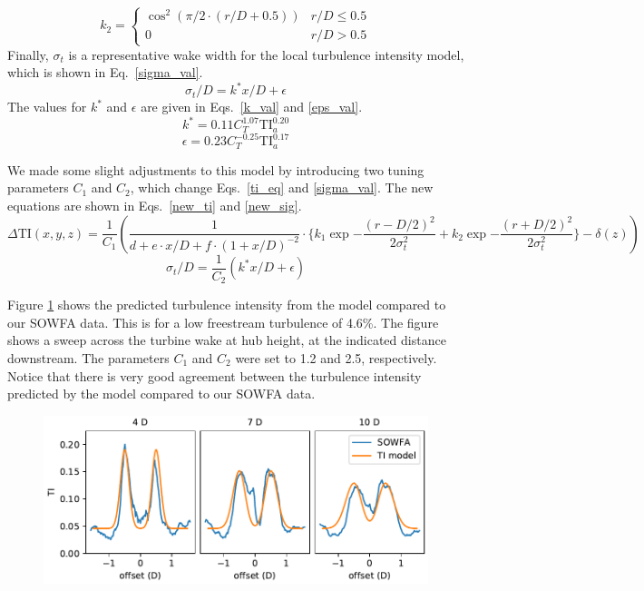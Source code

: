 \documentclass[11pt,letterpaper]{article}
\begin{document}
%
\begin{equation}
    \label{k2_val}
    k_2 = \begin{cases} 
      \cos^2{(\pi/2 \cdot (r/D + 0.5))} & r/D \leq 0.5 \\
      0 & r/D > 0.5
   \end{cases}
\end{equation}
% 
Finally, $\sigma_t$ is a representative wake width for the local turbulence intensity model, which is shown in Eq.~\ref{sigma_val}.
%
\begin{equation}
    \label{sigma_val}
    \sigma_t/D = k^* x/D + \epsilon
\end{equation}
% 
The values for $k^*$ and $\epsilon$ are given in Eqs.~\ref{k_val} and \ref{eps_val}.
%
\begin{equation}
    \label{k_val}
    k^* = 0.11 C_T^{1.07} \text{TI}_a ^ {0.20}
\end{equation}
%
\begin{equation}
    \label{eps_val}
    \epsilon = 0.23 C_T^{-0.25} \text{TI}_a^{0.17}
\end{equation}

We made some slight adjustments to this model by introducing two tuning parameters $C_1$ and $C_2$, which change Eqs.~\ref{ti_eq} and \ref{sigma_val}. The new equations are shown in Eqs.~\ref{new_ti} and \ref{new_sig}.
% 
\begin{equation}
    \label{new_ti}
    \Delta \text{TI}(x,y,z) = \frac{1}{C_1}(\frac{1}{d + e \cdot x/D + f\cdot(1+x/D)^{-2}} \cdot \Big\{k_1 \exp{-\frac{(r-D/2)^2}{2\sigma_t^2}} + k_2 \exp{-\frac{(r+D/2)^2}{2\sigma_t^2}} \Big\} - \delta(z))
\end{equation}
%
\begin{equation}
    \label{new_sig}
    \sigma_t/D = \frac{1}{C_2}(k^* x/D + \epsilon)
\end{equation}

Figure \ref{turbulence_sweep} shows the predicted turbulence intensity from the model compared to our SOWFA data. This is for a low freestream turbulence of 4.6\%. The figure shows a sweep across the turbine wake at hub height, at the indicated distance downstream. The parameters $C_1$ and $C_2$ were set to 1.2 and 2.5, respectively. Notice that there is very good agreement between the turbulence intensity predicted by the model compared to our SOWFA data.
% 
\begin{figure}
    \centering
    \includegraphics{images/turbulence_profiles.pdf}
    \caption{}
    \label{turbulence_sweep}
\end{figure}
\end{document}
